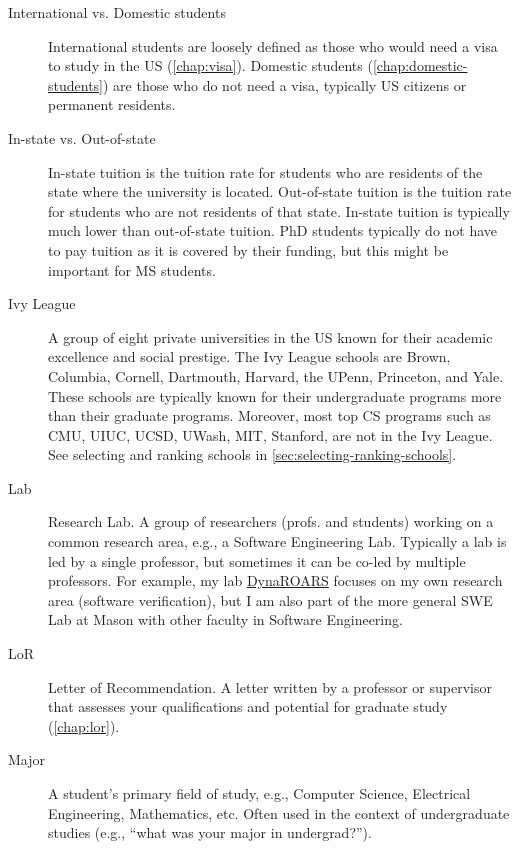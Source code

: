 \documentclass[oneside,11pt,dvipsnames]{book}
\begin{document}
\begin{description}
    
  \item[International vs. Domestic students] International students are loosely defined as those who would need a visa to study in the US (\autoref{chap:visa}). Domestic students (\autoref{chap:domestic-students}) are those who do not need a visa, typically US citizens or permanent residents.   
  

  \item [In-state vs. Out-of-state] In-state tuition is the tuition rate for students who are residents of the state where the university is located. Out-of-state tuition is the tuition rate for students who are not residents of that state. In-state tuition is typically much lower than out-of-state tuition. PhD students typically do not have to pay tuition as it is covered by their funding, but this might be important for MS students.
  
  \item [Ivy League] A group of eight private universities in the US known for their academic excellence and social prestige. The Ivy League schools are Brown, Columbia, Cornell, Dartmouth, Harvard, the UPenn, Princeton, and Yale. These schools are typically known for their undergraduate programs more than their graduate programs. Moreover, most top CS programs such as CMU, UIUC, UCSD, UWash, MIT, Stanford, are not in the Ivy League. See selecting and ranking schools in \autoref{sec:selecting-ranking-schools}.

  \item [Lab] Research Lab. A group of researchers (profs. and students) working on a common research area, e.g., a Software Engineering Lab.  Typically a lab is led by a single professor, but sometimes it can be co-led by multiple professors. For example, my lab \href{https://dynaroars.cs.gmu.edu}{DynaROARS} focuses on my own research area (software verification), but I am also part of the more general SWE Lab at Mason with other faculty in Software Engineering.

  \item[LoR] Letter of Recommendation. A letter written by a professor or supervisor that assesses your qualifications and potential for graduate study (\autoref{chap:lor}).

  \item[Major] A student's primary field of study, e.g., Computer Science, Electrical Engineering, Mathematics, etc. Often used in the context of undergraduate studies (e.g., ``what was your major in undergrad?'').


\end{description}
\end{document}
